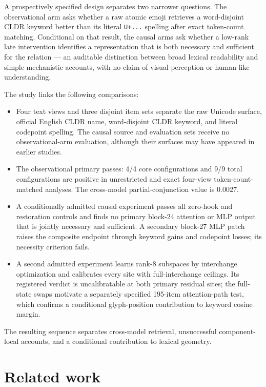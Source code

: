 \documentclass{article}
\begin{document}
A prospectively specified design separates two narrower questions. The
observational arm asks whether a raw atomic emoji retrieves a word-disjoint
CLDR keyword better than its literal \texttt{U+...} spelling after exact
token-count matching. Conditional on that result, the causal arms ask
whether a low-rank late intervention identifies a representation that is both
necessary and sufficient for the relation --- an auditable distinction
between broad lexical readability and simple mechanistic accounts, with no
claim of visual perception or human-like understanding.

The study links the following comparisons:

\begin{itemize}
  \item Four text views and three disjoint item sets separate the raw Unicode
  surface, official English CLDR name, word-disjoint CLDR keyword, and literal
  codepoint spelling. The causal source and evaluation sets receive no
  observational-arm evaluation, although their surfaces may have appeared in
  earlier studies.
  \item The observational primary passes: 4/4 core configurations and 9/9
  total configurations are positive in unrestricted and exact four-view
  token-count-matched analyses. The cross-model partial-conjunction value is
  $0.0027$.
  \item A conditionally admitted causal experiment passes all zero-hook and
  restoration controls and finds no primary block-24 attention or MLP output
  that is jointly necessary and sufficient. A secondary block-27 MLP patch
  raises the composite endpoint through keyword gains and codepoint losses;
  its necessity criterion fails.
  \item A second admitted experiment learns rank-8 subspaces by interchange
  optimization and calibrates every site with full-interchange ceilings. Its
  registered verdict is uncalibratable at both primary residual sites; the
  full-state swaps motivate a separately specified 195-item attention-path
  test, which confirms a conditional glyph-position contribution to keyword
  cosine margin.
\end{itemize}

The resulting sequence separates cross-model retrieval, unsuccessful
component-local accounts, and a conditional contribution to lexical geometry.

\section{Related work}
\end{document}

